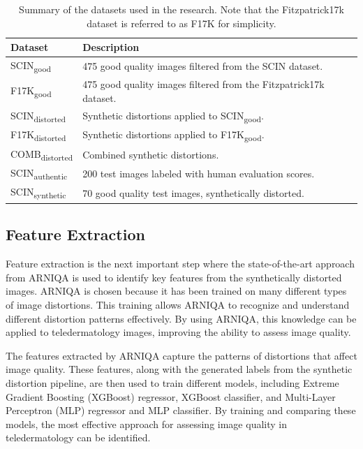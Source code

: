 \begin{table}[ht]
    \centering
    \begin{tabular}{|l|l|}
        \hline
        \textbf{Dataset} & \textbf{Description} \\
        \hline
        SCIN\textsubscript{good} & 475 good quality images filtered from the SCIN dataset. \\
        F17K\textsubscript{good} & 475 good quality images filtered from the Fitzpatrick17k dataset. \\
        SCIN\textsubscript{distorted} & Synthetic distortions applied to SCIN\textsubscript{good}. \\
        F17K\textsubscript{distorted} & Synthetic distortions applied to F17K\textsubscript{good}. \\
        COMB\textsubscript{distorted} & Combined synthetic distortions. \\
        \hline
        SCIN\textsubscript{authentic} & 200 test images labeled with human evaluation scores. \\
        SCIN\textsubscript{synthetic} & 70 good quality test images, synthetically distorted. \\
        \hline
    \end{tabular}
    \caption{Summary of the datasets used in the research. Note that the Fitzpatrick17k dataset is referred to as F17K for simplicity.}
    \label{table:dataset_summary}
\end{table}

\subsection{Feature Extraction}
\label{sub:FeatureExtraction}
Feature extraction is the next important step where the state-of-the-art approach from ARNIQA \autocite{ARNIQA} is used to identify key features from the synthetically distorted images. ARNIQA is chosen because it has been trained on many different types of image distortions. This training allows ARNIQA to recognize and understand different distortion patterns effectively. By using ARNIQA, this knowledge can be applied to teledermatology images, improving the ability to assess image quality. \par
\vspace{\baselineskip}
\noindent
The features extracted by ARNIQA capture the patterns of distortions that affect image quality. These features, along with the generated labels from the synthetic distortion pipeline, are then used to train different models, including Extreme Gradient Boosting (XGBoost) regressor, XGBoost classifier, and Multi-Layer Perceptron (MLP) regressor and MLP classifier. By training and comparing these models, the most effective approach for assessing image quality in teledermatology can be identified. \par

